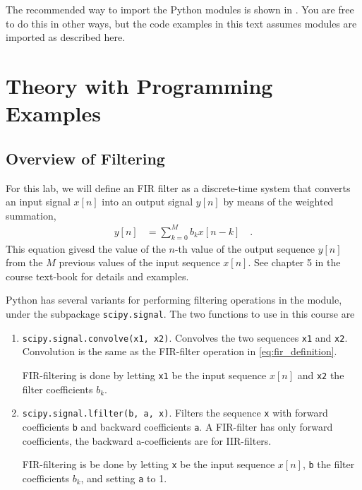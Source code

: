 The recommended way to import the Python modules is shown in . 
You are free to do this in other ways, but the code examples in this text assumes modules are imported as described here.

\afterpage{\clearpage
}


\section{Theory with Programming Examples}

\subsection{Overview of Filtering}
For this lab, we will define an FIR filter as a discrete-time system that converts an input signal $x[n]$ into an
output signal $y[n]$ by means of the weighted summation,
\begin{align}
	y[n] &= \sum_{k=0}^{M} b_k x[n-k]  \quad .
	\label{eq:fir_definition}
\end{align}
This equation givesd the value of the $n$-th value of the output sequence $y[n]$ from the $M$ previous values of the input sequence $x[n]$. 
See chapter 5 in the course text-book for details and examples.

Python has several variants for performing filtering operations in the \scipy module, under the subpackage \verb|scipy.signal|. The two functions to use in this course are 
\begin{enumerate}[1.]
	\item \verb|scipy.signal.convolve(x1, x2)|. Convolves the two sequences \verb|x1| and \verb|x2|. Convolution is the same as the FIR-filter operation in \eqref{eq:fir_definition}. 
	
	FIR-filtering is done by letting  \verb|x1| be the input sequence $x[n]$ and \verb|x2|  the filter coefficients $b_k$.
	
	\item \verb|scipy.signal.lfilter(b, a, x)|. Filters the sequence \verb|x| with forward coefficients \verb|b| and  backward coefficients \verb|a|. A FIR-filter has only forward coefficients, the backward a-coefficients are for IIR-filters. 
	
	FIR-filtering is be done by letting  \verb|x| be the input sequence $x[n]$, \verb|b| the filter coefficients $b_k$, and setting \verb|a| to 1.
\end{enumerate}


